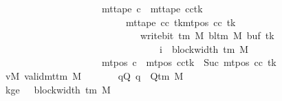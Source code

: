 \begin{isabellebody}
\ \ \ \ \ \ \ \ \ \ \ \ \ \ \ \ \ \ \ \ \ \ \ \ \ \ {\isasymand}\ mt{\isacharunderscore}{\kern0pt}tape\ c{\isacharprime}{\kern0pt}{\isacharprime}{\kern0pt}\ {\isacharequal}{\kern0pt}\ {\isacharparenleft}{\kern0pt}mt{\isacharunderscore}{\kern0pt}tape\ cc{\isacharparenright}{\kern0pt}{\isacharparenleft}{\kern0pt}tk\ {\isacharcolon}{\kern0pt}{\isacharequal}{\kern0pt}\isanewline
\ \ \ \ \ \ \ \ \ \ \ \ \ \ \ \ \ \ \ \ \ \ \ \ \ \ \ \ \ \ \ \ {\isacharparenleft}{\kern0pt}mt{\isacharunderscore}{\kern0pt}tape\ cc\ tk{\isacharparenright}{\kern0pt}{\isacharparenleft}{\kern0pt}mt{\isacharunderscore}{\kern0pt}pos\ cc\ tk\isanewline
\ \ \ \ \ \ \ \ \ \ \ \ \ \ \ \ \ \ \ \ \ \ \ \ \ \ \ \ \ \ \ \ \ \ {\isacharcolon}{\kern0pt}{\isacharequal}{\kern0pt}\ write{\isacharunderscore}{\kern0pt}bit\ {\isacharparenleft}{\kern0pt}{\isasymGamma}{\isacharunderscore}{\kern0pt}tm\ M{\isacharparenright}{\kern0pt}\ {\isacharparenleft}{\kern0pt}bl{\isacharunderscore}{\kern0pt}tm\ M{\isacharparenright}{\kern0pt}\ {\isacharparenleft}{\kern0pt}buf\ tk{\isacharparenright}{\kern0pt}\isanewline
\ \ \ \ \ \ \ \ \ \ \ \ \ \ \ \ \ \ \ \ \ \ \ \ \ \ \ \ \ \ \ \ \ \ \ \ \ \ \ {\isacharparenleft}{\kern0pt}i\ {\isacharminus}{\kern0pt}\ block{\isacharunderscore}{\kern0pt}width\ {\isacharparenleft}{\kern0pt}{\isasymGamma}{\isacharunderscore}{\kern0pt}tm\ M{\isacharparenright}{\kern0pt}{\isacharparenright}{\kern0pt}{\isacharparenright}{\kern0pt}{\isacharparenright}{\kern0pt}\isanewline
\ \ \ \ \ \ \ \ \ \ \ \ \ \ \ \ \ \ \ \ \ \ \ \ \ \ {\isasymand}\ mt{\isacharunderscore}{\kern0pt}pos\ c{\isacharprime}{\kern0pt}{\isacharprime}{\kern0pt}\ {\isacharequal}{\kern0pt}\ {\isacharparenleft}{\kern0pt}mt{\isacharunderscore}{\kern0pt}pos\ cc{\isacharparenright}{\kern0pt}{\isacharparenleft}{\kern0pt}tk\ {\isacharcolon}{\kern0pt}{\isacharequal}{\kern0pt}\ Suc\ {\isacharparenleft}{\kern0pt}mt{\isacharunderscore}{\kern0pt}pos\ cc\ tk{\isacharparenright}{\kern0pt}{\isacharparenright}{\kern0pt}{\isachardoublequoteclose}\isanewline
\ \ \ \ \ \ \ vM{\isacharcolon}{\kern0pt}\ {\isachardoublequoteopen}valid{\isacharunderscore}{\kern0pt}mttm\ M{\isachardoublequoteclose}\isanewline
\ \ \ \ \ \ \ qQ{\isacharcolon}{\kern0pt}\ {\isachardoublequoteopen}q\ {\isasymin}\ Q{\isacharunderscore}{\kern0pt}tm\ M{\isachardoublequoteclose}\isanewline
\ \ \ \ \ \ \ kge{}{\isacharcolon}{\kern0pt}\ {\isachardoublequoteopen}{}\ {\isasymle}\ block{\isacharunderscore}{\kern0pt}width\ {\isacharparenleft}{\kern0pt}{\isasymGamma}{\isacharunderscore}{\kern0pt}tm\ M{\isacharparenright}{\kern0pt}{\isachardoublequoteclose}\isanewline

\end{isabellebody}
